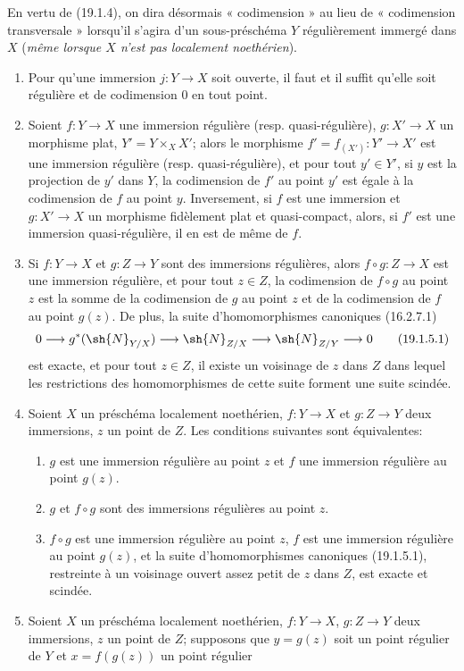 En vertu de (19.1.4), on dira désormais « codimension » au lieu de « codimension transversale » lorsqu'il s'agira d'un sous-préschéma $Y$ régulièrement immergé dans $X$ (\emph{même lorsque $X$ n'est pas localement noethérien}).

\begin{proposition}[19.1.5]
\label{IV.19.1.5}
\begin{enumerate}
  \item[(i)] Pour qu'une immersion $j:Y\to X$ soit ouverte, il faut et il suffit qu'elle soit régulière et de codimension $0$ en tout point.
  \item[(ii)] Soient $f:Y\to X$ une immersion régulière (resp. quasi-régulière), $g:X'\to X$ un morphisme plat, $Y'=Y\times_X X'$; alors le morphisme $f'=f_{(X')}:Y'\to X'$ est une immersion régulière (resp. quasi-régulière), et pour tout $y'\in Y'$, si $y$ est la projection de $y'$ dans $Y$, la codimension de $f'$ au point $y'$ est égale à la codimension de $f$ au point $y$. Inversement, si $f$ est une immersion et $g:X'\to X$ un morphisme fidèlement plat et quasi-compact, alors, si $f'$ est une immersion quasi-régulière, il en est de même de $f$.
  \item[(iii)] Si $f:Y\to X$ et $g:Z\to Y$ sont des immersions régulières, alors $f\circ g:Z\to X$ est une immersion régulière, et pour tout $z\in Z$, la codimension de $f\circ g$ au point $z$ est la somme de la codimension de $g$ au point $z$ et de la codimension de $f$ au point $g(z)$. De plus, la suite d'homomorphismes canoniques (16.2.7.1)
\begin{equation}
  0\longrightarrow g^*(\sh{N}_{Y/X})\longrightarrow\sh{N}_{Z/X}\longrightarrow\sh{N}_{Z/Y}\longrightarrow0
  \tag{19.1.5.1}\label{IV.19.1.5.1}
\end{equation}
est exacte, et pour tout $z\in Z$, il existe un voisinage de $z$ dans $Z$ dans lequel les restrictions des homomorphismes de cette suite forment une suite scindée.
  \item[(iv)] Soient $X$ un préschéma localement noethérien, $f:Y\to X$ et $g:Z\to Y$ deux immersions, $z$ un point de $Z$. Les conditions suivantes sont équivalentes:
  \begin{enumerate}
    \item[a)] $g$ est une immersion régulière au point $z$ et $f$ une immersion régulière au point $g(z)$.
    \item[b)] $g$ et $f\circ g$ sont des immersions régulières au point $z$.
    \item[c)] $f\circ g$ est une immersion régulière au point $z$, $f$ est une immersion régulière au point $g(z)$, et la suite d'homomorphismes canoniques (19.1.5.1), restreinte à un voisinage ouvert assez petit de $z$ dans $Z$, est exacte et scindée.
  \end{enumerate}
  \item[(v)] Soient $X$ un préschéma localement noethérien, $f:Y\to X$, $g:Z\to Y$ deux immersions, $z$ un point de $Z$; supposons que $y=g(z)$ soit un point régulier de $Y$ et $x=f(g(z))$ un point régulier


\end{enumerate}
\end{proposition}
